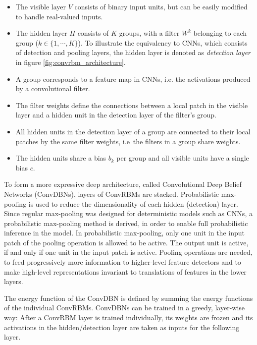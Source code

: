 \begin{itemize}
    \item The visible layer $V$ consists of binary input units, but can be easily modified to handle real-valued inputs.
    \item The hidden layer $H$ consists of $K$ groups, with a filter $W^k$ belonging to each group ($k \in \{1,\cdots, K\}$).
        To illustrate the equivalency to CNNs, which consists of detection and pooling layers, the hidden layer is denoted as \textit{detection layer} in figure \ref{fig:convrbm_architecture}.
    \item A group corresponds to a feature map in CNNs, i.e. the activations produced by a convolutional filter.
    \item The filter weights define the connections between a local patch in the visible layer and a hidden unit in the detection layer of the filter's group.
    \item All hidden units in the detection layer of a group are connected to their local patches by the same filter weights, i.e\ the filters in a group share weights.
    \item The hidden units share a bias $b_k$ per group and all visible units have a single bias $c$.
\end{itemize}

To form a more expressive deep architecture, called Convolutional Deep Belief Networks (ConvDBNs), layers of ConvRBMs are stacked.
Probabilistic max-pooling is used to reduce the dimensionality of each hidden (detection) layer.
Since regular max-pooling was designed for deterministic models such as CNNs, a probabilistic max-pooling method is derived, in order to enable full probabilistic inference in the model.
In probabilistic max-pooling, only one unit in the input patch of the pooling operation is allowed to be active.
The output unit is active, if and only if one unit in the input patch is active.
Pooling operations are needed, to feed progressively more information to higher-level feature detectors and to make high-level representations invariant to translations of features in the lower layers. \cite{lee_convolutional_2009-1}

The energy function of the ConvDBN is defined by summing the energy functions of the individual ConvRBMs.
ConvDBNs can be trained in a greedy, layer-wise way: After a ConvRBM layer is trained individually, its weights are frozen and its activations in the hidden/detection layer are taken as inputs for the following layer.
\cite{lee_convolutional_2009-1}

